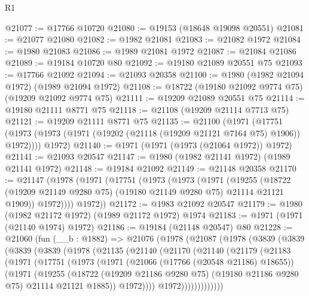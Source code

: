 \begin{lexlean}{R1}
\begin{coremodule}
@21077 := @17766 @10720
@21080 := @19153 (@18648 @19098 @20551)
@21081 := @21077 @21080
@21082 := @1982 @21081
@21083 := @21082 @1972
@21084 := @1980 @21083
@21086 := @1989 @21081 @1972
@21087 := @21084 @21086
@21089 := @19184 @10720 @80
@21092 := @19180 @21089 @20551 @75
@21093 := @17766 @21092
@21094 := @21093 @20358
@21100 := @1980 (@1982 @21094 @1972) (@1989 @21094 @1972)
@21108 := @18722 (@19180 @21092 @9774 @75) (@19209 @21092 @9774 @75)
@21111 := @19209 @21089 @20551 @75
@21114 := @19180 @21111 @8771 @75
@21118 := @21108 (@19209 @21114 @7713 @75)
@21121 := @19209 @21111 @8771 @75
@21135 := @21100
    (@1971
      (@17751 (@1973 (@1973 (@1971 (@19202 (@21118 (@19209 @21121 @7164 @75) @1906)) @1972))))
      @1972)
@21140 := @1971 (@1971 (@1973 (@21064 @1972)) @1972)
@21141 := @21093 @20547
@21147 := @1980 (@1982 @21141 @1972) (@1989 @21141 @1972)
@21148 := @19184 @21092
@21149 := @21148 @20358
@21170 := @21147
    (@1978
      (@1971
        (@17751
          (@1973
            (@1973
              (@1971
                (@19255
                  (@18722 (@19209 @21149 @9280 @75) (@19180 @21149 @9280 @75) @21114 @21121 @1909))
                @1972))))
        @1972))
@21172 := @1983 @21092 @20547
@21179 := @1980 (@1982 @21172 @1972) (@1989 @21172 @1972) @1974
@21183 := @1971 (@1971 (@21140 @1974) @1972)
@21186 := @19184 (@21148 @20547) @80
@21228 := @21060
    (fun (__b : @1882) =>
    @21076
      (@1978
        (@21087
          (@1978
            (@3839
              (@3839
                (@3839
                  (@3839
                    (@1978
                      (@21135
                        (@21140
                          (@21170
                            (@21140
                              (@21179
                                (@21183
                                  (@1971
                                    (@17751
                                      (@1973
                                        (@1971
                                          (@21066 (@17766 (@20548 @21186) @18655))
                                          (@1971
                                            (@19255
                                              (@18722
                                                (@19209 @21186 @9280 @75)
                                                (@19180 @21186 @9280 @75)
                                                @21114
                                                @21121
                                                @1885))
                                            @1972))))
                                    @1972)))))))))))))

\end{coremodule}
\end{lexlean}
